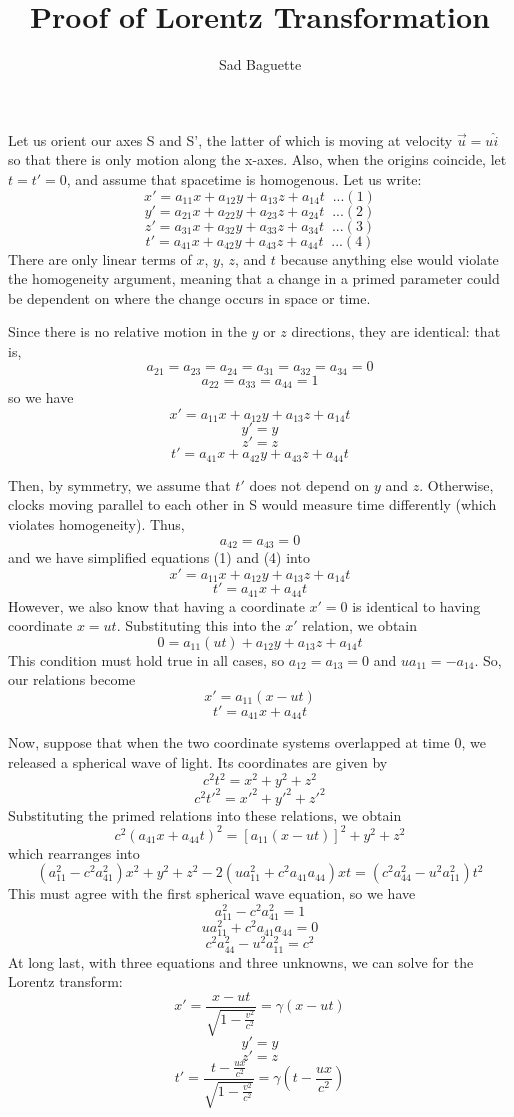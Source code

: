 \documentclass[12pt]{article}
\title{Proof of Lorentz Transformation}
\author{Sad Baguette}
\date{}
\begin{document}
\maketitle
Let us orient our axes S and S', the latter of which is moving at velocity $\vec{u} = u\hat{i}$ so that there is only motion along the x-axes. Also, when the origins coincide, let $t=t'=0$, and assume that spacetime is homogenous. Let us write: 
\[ x' = a_{11}x + a_{12}y + a_{13}z + a_{14}t \; \; ...(1)\]
\[ y' = a_{21}x + a_{22}y + a_{23}z + a_{24}t \; \; ...(2)\] 
\[ z' = a_{31}x + a_{32}y + a_{33}z + a_{34}t \; \; ...(3)\] 
\[ t' = a_{41}x + a_{42}y + a_{43}z + a_{44}t \; \; ...(4)\] 
There are only linear terms of $x$, $y$, $z$, and $t$ because anything else would violate the homogeneity argument, meaning that a change in a primed parameter could be dependent on where the change occurs in space or time. \bigskip

Since there is no relative motion in the $y$ or $z$ directions, they are identical: that is, 
\[ a_{21} = a_{23} = a_{24} = a_{31} = a_{32} = a_{34} = 0 \] 
\[ a_{22} = a_{33} = a_{44} = 1 \] 
\bigskip
so we have
\[ x' = a_{11}x + a_{12}y + a_{13}z + a_{14}t \]
\[ y' = y \] 
\[ z' = z \] 
\[ t' = a_{41}x + a_{42}y + a_{43}z + a_{44}t \] \bigskip

Then, by symmetry, we assume that $t'$ does not depend on $y$ and $z$. Otherwise, clocks moving parallel to each other in S would measure time differently (which violates homogeneity). Thus, 
\[ a_{42} = a_{43} = 0 \] 
and we have simplified equations (1) and (4) into 
\[ x' = a_{11}x + a_{12}y + a_{13}z + a_{14}t \]
\[ t' = a_{41}x + a_{44}t \]
However, we also know that having a coordinate $x'=0$ is identical to having coordinate $x=ut$. Substituting this into the $x'$ relation, we obtain 
\[ 0 = a_{11}(ut) + a_{12}y + a_{13}z + a_{14}t \] 
This condition must hold true in all cases, so $a_{12}=a_{13}=0$ and $ua_{11} = -a_{14}$. So, our relations become
\[ x' = a_{11}(x - ut) \] 
\[ t' = a_{41}x + a_{44}t \] 
\bigskip

Now, suppose that when the two coordinate systems overlapped at time 0, we released a spherical wave of light. Its coordinates are given by
\[ c^2 t^2 = x^2 + y^2 + z^2 \] 
\[ c^2 t'^2 = x'^2 + y'^2 + z'^2 \] 
Substituting the primed relations into these relations, we obtain
\[ c^2 (a_{41}x + a_{44}t)^2 = [a_{11}(x - ut)]^2 + y^2 + z^2 \] 
which rearranges into 
\[ (a_{11}^2 - c^2 a_{41}^2)x^2 + y^2 + z^2 - 2(ua_{11}^2 + c^2 a_{41}a_{44})xt = (c^2 a_{44}^2 - u^2 a_{11}^2)t^2 \] 
This must agree with the first spherical wave equation, so we have
\[ a_{11}^2 - c^2 a_{41}^2 = 1 \] 
\[ ua_{11}^2 + c^2 a_{41}a_{44} = 0 \] 
\[ c^2 a_{44}^2 - u^2 a_{11}^2 = c^2 \] 
At long last, with three equations and three unknowns, we can solve for the Lorentz transform: 
\[ x' = \frac{x - ut}{\sqrt{1 - \frac{v^2}{c^2}}} = \gamma (x - ut)\] 
\[ y' = y \] 
\[ z' = z \] 
\[ t' = \frac{t - \frac{ux}{c^2}}{\sqrt{1 - \frac{v^2}{c^2}}} = \gamma \left(t - \frac{ux}{c^2} \right) \] 
\end{document}
